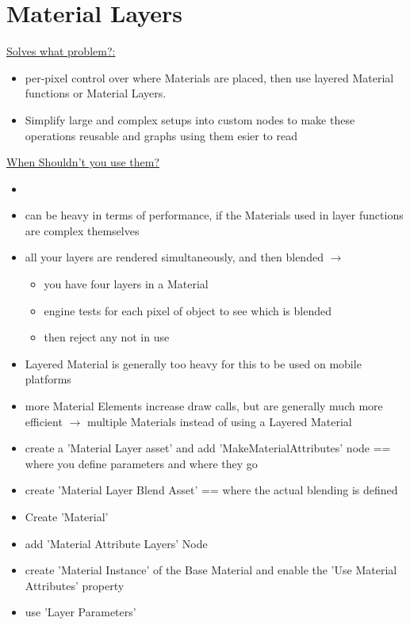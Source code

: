     \section{Material Layers}
        \uline{Solves what problem?:} 
        \begin{itemize}
            \item per-pixel control over where Materials are placed, then use layered Material functions or Material Layers.
            \item Simplify large and complex setups into custom nodes to make these operations reusable and graphs using them esier to read
        \end{itemize}
        \uline{When Shouldn't you use them?}
        \begin{itemize}
            \item 
            \item can be heavy in terms of performance, if the Materials used in layer functions are complex themselves
            \item all your layers are rendered simultaneously, and then blended $\rightarrow$
            \begin{itemize}
                \item you have four layers in a Material
                \item engine tests for each pixel of object to see which is blended
                \item then reject any not in use
            \end{itemize} 
            \item Layered Material is generally too heavy for this to be used on mobile platforms
            \item more Material Elements increase draw calls, but are generally much more efficient $\rightarrow$ multiple Materials instead of using a Layered Material
        \end{itemize}

        \begin{itemize}
            \item create a 'Material Layer asset' and add 'MakeMaterialAttributes' node == where you define parameters and where they go
            \item create 'Material Layer Blend Asset' == where the actual blending is defined
            \item Create 'Material'
            \item add 'Material Attribute Layers' Node 
            \item create 'Material Instance' of the Base Material and enable the 'Use Material Attributes' property
            \item use 'Layer Parameters'
        \end{itemize}

